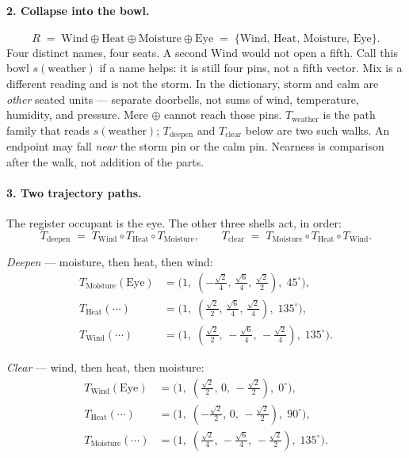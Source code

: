 \documentclass[12pt, a4paper]{article}
\begin{document}
\paragraph{2. Collapse into the bowl.}
\begin{equation}
    R
    \;=\;
    \mathrm{Wind}\oplus\mathrm{Heat}\oplus\mathrm{Moisture}\oplus\mathrm{Eye}
    \;=\;
    \{\mathrm{Wind},\,\mathrm{Heat},\,\mathrm{Moisture},\,\mathrm{Eye}\}.
    \label{eq:storm_bowl}
\end{equation}
Four distinct names, four seats. A second $\mathrm{Wind}$ would not
open a fifth. Call this bowl $s(\mathrm{weather})$ if a name helps:
it is still four pins, not a fifth vector. Mix is a different
reading and is not the storm.
In the dictionary, $\mathrm{storm}$ and $\mathrm{calm}$ are
\emph{other} seated units --- separate doorbells, not sums of
wind, temperature, humidity, and pressure. Mere $\oplus$ cannot
reach those pins. $T_{\mathrm{weather}}$ is the path family that
reads $s(\mathrm{weather})$; $T_{\mathrm{deepen}}$ and
$T_{\mathrm{clear}}$ below are two such walks. An endpoint may
fall \emph{near} the storm pin or the calm pin. Nearness is
comparison after the walk, not addition of the parts.

\paragraph{3. Two trajectory paths.}
The register occupant is the eye. The other three shells act, in order:
\begin{equation}
    T_{\mathrm{deepen}}
    \;=\;
    T_{\mathrm{Wind}}\circ T_{\mathrm{Heat}}\circ T_{\mathrm{Moisture}},
    \qquad
    T_{\mathrm{clear}}
    \;=\;
    T_{\mathrm{Moisture}}\circ T_{\mathrm{Heat}}\circ T_{\mathrm{Wind}}.
\end{equation}

\emph{Deepen} --- moisture, then heat, then wind:
\begin{align*}
T_{\mathrm{Moisture}}(\mathrm{Eye})
&= \bigl(1,\;(-\tfrac{\sqrt{2}}{4},\,\tfrac{\sqrt{6}}{4},\,\tfrac{\sqrt{2}}{2}),\;45^\circ\bigr),\\
T_{\mathrm{Heat}}(\cdots)
&= \bigl(1,\;(\tfrac{\sqrt{2}}{2},\,\tfrac{\sqrt{6}}{4},\,\tfrac{\sqrt{2}}{4}),\;135^\circ\bigr),\\
T_{\mathrm{Wind}}(\cdots)
&= \bigl(1,\;(\tfrac{\sqrt{2}}{2},\,-\tfrac{\sqrt{6}}{4},\,-\tfrac{\sqrt{2}}{4}),\;135^\circ\bigr).
\end{align*}

\emph{Clear} --- wind, then heat, then moisture:
\begin{align*}
T_{\mathrm{Wind}}(\mathrm{Eye})
&= \bigl(1,\;(\tfrac{\sqrt{2}}{2},\,0,\,-\tfrac{\sqrt{2}}{2}),\;0^\circ\bigr),\\
T_{\mathrm{Heat}}(\cdots)
&= \bigl(1,\;(-\tfrac{\sqrt{2}}{2},\,0,\,-\tfrac{\sqrt{2}}{2}),\;90^\circ\bigr),\\
T_{\mathrm{Moisture}}(\cdots)
&= \bigl(1,\;(\tfrac{\sqrt{2}}{4},\,-\tfrac{\sqrt{6}}{4},\,-\tfrac{\sqrt{2}}{2}),\;135^\circ\bigr).
\end{align*}
\end{document}
